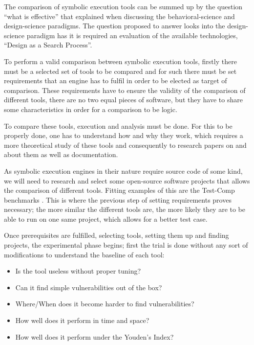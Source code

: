 The comparison of symbolic execution tools can be summed up by the question ``what is effective'' that \citet{Hevner2004} explained when discussing the behavioral-science  and design-science paradigms. The question proposed to answer looks into the design-science paradigm has it is required an evaluation of the available technologies, ``Design as a Search Process''. 

To perform a valid comparison between symbolic execution tools, firstly there must be a selected set of tools to be compared and for such there must be set requirements that an engine has to fulfil in order to be elected as target of comparison. These requirements have to ensure the validity of the comparison of different tools, there are no two equal pieces of software, but they have to share some characteristics in order for a comparison to be logic.

To compare these tools, execution and analysis must be done. For this to be properly done, one has to understand how and why they work, which requires a more theoretical study of these tools and consequently to research papers on and about them as well as documentation.

As symbolic execution engines in their nature require source code of some kind, we will need to research and select some open-source software projects that allows the comparison of different tools. Fitting examples of this are the Test-Comp benchmarks \citep{Andrès2024}. This is where the previous step of setting requirements proves necessary; the more similar the different tools are, the more likely they are to be able to run on one same project, which allows for a better test case.

Once prerequisites are fulfilled, selecting tools, setting them up and finding projects, the experimental phase begins; first the trial is done without any sort of modifications to understand the baseline of each tool:
\begin{itemize}
    \item Is the tool useless without proper tuning?
    \item Can it find simple vulnerabilities out of the box?
    \item Where/When does it become harder to find vulnerabilities?
    \item How well does it perform in time and space?
    \item How well does it perform under the Youden's Index?
\end{itemize}

